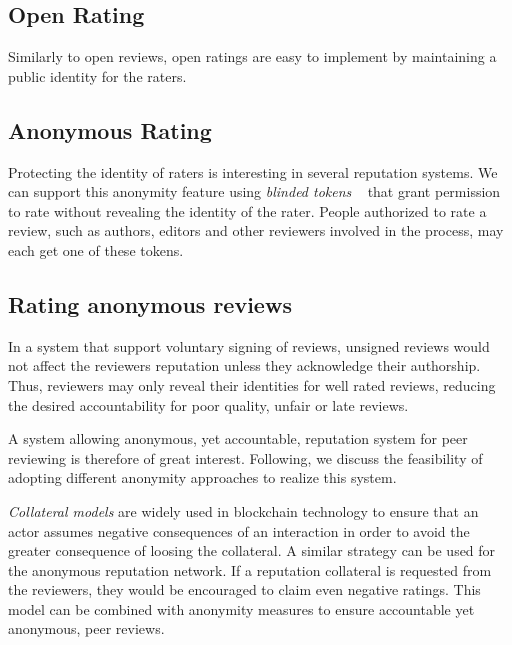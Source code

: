 

\subsection*{Open Rating}

Similarly to open reviews, open ratings are easy to implement by maintaining a
public identity for the raters.

\subsection{Anonymous Rating}

Protecting the identity of raters is interesting in several reputation systems.
We can support this anonymity feature using \emph{blinded tokens}
~\cite{schaub2016trustless} that grant permission to rate without revealing the
identity of the rater. People authorized to rate a review, such as authors,
editors and other reviewers involved in the process, may each get one of these
tokens.

\subsection*{Rating anonymous reviews}

In a system that support voluntary signing of reviews, unsigned reviews would
not affect the reviewers reputation unless they acknowledge their authorship.
Thus, reviewers may only reveal their identities for well rated reviews,
reducing the desired accountability for poor quality, unfair or late reviews.

A system allowing anonymous, yet accountable, reputation system for peer
reviewing is therefore of great interest. Following, we discuss the feasibility
of adopting different anonymity approaches to realize this system.

\emph{Collateral models} are widely used in blockchain technology to ensure that
an actor assumes negative consequences of an interaction in order to avoid the
greater consequence of loosing the collateral. A similar strategy can be used
for the anonymous reputation network. If a reputation collateral is requested
from the reviewers, they would be encouraged to claim even negative ratings.
This model can be combined with anonymity measures to ensure accountable yet
anonymous, peer reviews.

